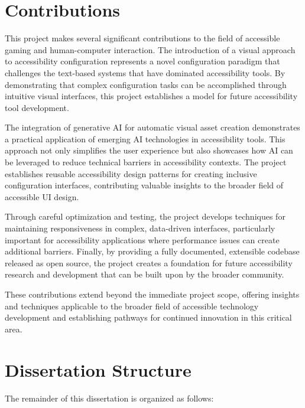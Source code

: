 \section{Contributions}
This project makes several significant contributions to the field of accessible gaming and human-computer interaction. The introduction of a visual approach to accessibility configuration represents a novel configuration paradigm that challenges the text-based systems that have dominated accessibility tools. By demonstrating that complex configuration tasks can be accomplished through intuitive visual interfaces, this project establishes a model for future accessibility tool development.

The integration of generative AI for automatic visual asset creation demonstrates a practical application of emerging AI technologies in accessibility tools. This approach not only simplifies the user experience but also showcases how AI can be leveraged to reduce technical barriers in accessibility contexts. The project establishes reusable accessibility design patterns for creating inclusive configuration interfaces, contributing valuable insights to the broader field of accessible UI design.

Through careful optimization and testing, the project develops techniques for maintaining responsiveness in complex, data-driven interfaces, particularly important for accessibility applications where performance issues can create additional barriers. Finally, by providing a fully documented, extensible codebase released as open source, the project creates a foundation for future accessibility research and development that can be built upon by the broader community.

These contributions extend beyond the immediate project scope, offering insights and techniques applicable to the broader field of accessible technology development and establishing pathways for continued innovation in this critical area.

\section{Dissertation Structure}
The remainder of this dissertation is organized as follows:

